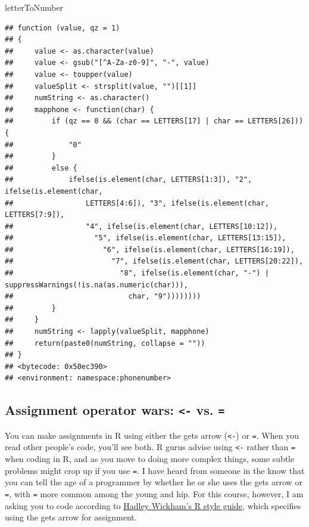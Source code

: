 \documentclass[]{book}
\makeatletter
\newenvironment{Shaded}{\begin{snugshade}}{\end{snugshade}}
\newcommand{\NormalTok}[1]{#1}
\newenvironment{kframe}{%
\medskip{}
\setlength{\fboxsep}{.8em}
 \def\at@end@of@kframe{}%
 \ifinner\ifhmode%
  \def\at@end@of@kframe{\end{minipage}}%
  \begin{minipage}{\columnwidth}%
 \fi\fi%
 \def\FrameCommand##1{\hskip\@totalleftmargin \hskip-\fboxsep
 \colorbox{shadecolor}{##1}\hskip-\fboxsep
     \hskip-\linewidth \hskip-\@totalleftmargin \hskip\columnwidth}%
 \MakeFramed {\advance\hsize-\width
   \@totalleftmargin\z@ \linewidth\hsize
   \@setminipage}}%
 {\par\unskip\endMakeFramed%
 \at@end@of@kframe}
\renewenvironment{Shaded}{\begin{kframe}}{\end{kframe}}
\theoremstyle{definition}
\theoremstyle{definition}
\theoremstyle{definition}
\theoremstyle{remark}
\makeatother
\begin{document}
\begin{Shaded}
\begin{Highlighting}[]
\NormalTok{letterToNumber}
\end{Highlighting}
\end{Shaded}

\begin{verbatim}
## function (value, qz = 1) 
## {
##     value <- as.character(value)
##     value <- gsub("[^A-Za-z0-9]", "-", value)
##     value <- toupper(value)
##     valueSplit <- strsplit(value, "")[[1]]
##     numString <- as.character()
##     mapphone <- function(char) {
##         if (qz == 0 && (char == LETTERS[17] | char == LETTERS[26])) {
##             "0"
##         }
##         else {
##             ifelse(is.element(char, LETTERS[1:3]), "2", ifelse(is.element(char, 
##                 LETTERS[4:6]), "3", ifelse(is.element(char, LETTERS[7:9]), 
##                 "4", ifelse(is.element(char, LETTERS[10:12]), 
##                   "5", ifelse(is.element(char, LETTERS[13:15]), 
##                     "6", ifelse(is.element(char, LETTERS[16:19]), 
##                       "7", ifelse(is.element(char, LETTERS[20:22]), 
##                         "8", ifelse(is.element(char, "-") | suppressWarnings(!is.na(as.numeric(char))), 
##                           char, "9"))))))))
##         }
##     }
##     numString <- lapply(valueSplit, mapphone)
##     return(paste0(numString, collapse = ""))
## }
## <bytecode: 0x50ec390>
## <environment: namespace:phonenumber>
\end{verbatim}

\subsection{\texorpdfstring{Assignment operator wars:
\texttt{\textless{}-} vs.
\texttt{=}}{Assignment operator wars: \textless{}- vs. =}}\label{assignment-operator-wars---vs.}

You can make assignments in R using either the gets arrow
(\texttt{\textless{}-}) or \texttt{=}. When you read other people's
code, you'll see both. R gurus advise using \texttt{\textless{}-} rather
than \texttt{=} when coding in R, and as you move to doing more complex
things, some subtle problems might crop up if you use \texttt{=}. I have
heard from someone in the know that you can tell the age of a programmer
by whether he or she uses the gets arrow or \texttt{=}, with \texttt{=}
more common among the young and hip. For this course, however, I am
asking you to code according to
\href{http://adv-r.had.co.nz/Style.html}{Hadley Wickham's R style
guide}, which specifies using the gets arrow for assignment.
\end{document}
